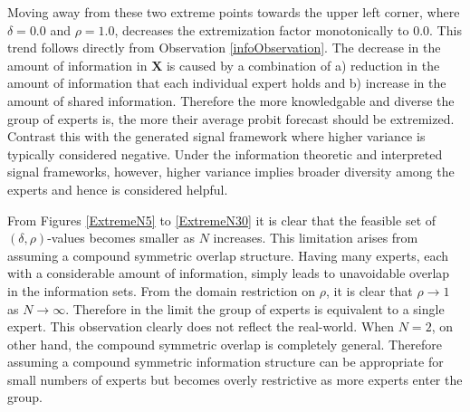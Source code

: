 \documentclass[11pt,twoside]{article}
\begin{document}
Moving away from these two extreme points towards the upper left corner, where $\delta = 0.0$ and $\rho = 1.0$, decreases the extremization factor monotonically to $0.0$. This trend follows directly from Observation \ref{infoObservation}. The decrease in the amount of information in $\boldsymbol{X}$  is caused by a combination of a) reduction in the amount of information that each individual expert holds and b) increase in the amount of shared information. Therefore the more knowledgable and diverse the group of experts is, the more their average probit forecast should be extremized. Contrast this with the generated signal framework where higher variance is typically considered negative. Under the information theoretic and interpreted signal frameworks, however, higher variance implies broader diversity among the experts and hence is considered helpful. 

From Figures \ref{ExtremeN5} to \ref{ExtremeN30} it is clear that the feasible set of $(\delta, \rho)$-values becomes smaller as $N$ increases. This limitation arises from assuming a compound symmetric overlap structure. Having many experts, each with a considerable amount of information, simply leads to unavoidable overlap in the information sets. From the domain restriction on $\rho$, it is clear that $\rho \to 1$ as $N \to \infty$. Therefore in the limit the group of experts is equivalent to a single expert. This observation clearly does not reflect the real-world. When $N = 2$, on other hand, the compound symmetric overlap is completely general. Therefore assuming a compound symmetric information structure can be appropriate for small numbers of experts but becomes overly restrictive as more experts enter the group. 

\end{document}
